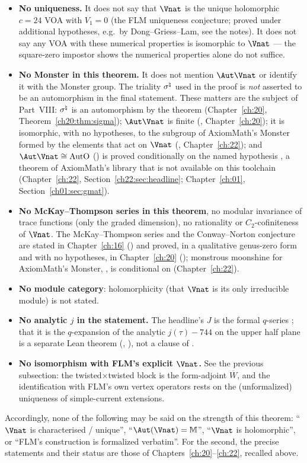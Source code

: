 \begin{itemize}
\item \textbf{No uniqueness.}  It does not say that $\Vnat$ is the unique holomorphic $c=24$ VOA with
  $V_1=0$ (the FLM uniqueness conjecture; proved under additional hypotheses, e.g.\ by
  Dong--Griess--Lam, see the notes).  It does not say any VOA with these numerical properties is
  isomorphic to $\Vnat$ — the square-zero impostor shows the numerical properties alone do not suffice.
\item \textbf{No Monster in this theorem.}  It does not mention $\Aut\Vnat$ or identify it with the Monster group.
  The triality $\sigma^{\natural}$ used in the proof is \emph{not} asserted to be an automorphism in the final
  statement.  These matters are the subject of Part~VIII: $\sigma^{\natural}$ is an automorphism by the theorem
   (Chapter~\ref{ch:20}, Theorem~\ref{ch20:thm:sigma}); $\Aut\Vnat$ is finite
  (, Chapter~\ref{ch:20}); it is isomorphic, with no hypotheses, to the subgroup of
  AxiomMath's Monster  formed by the elements that act on $\Vnat$
  (, Chapter~\ref{ch:22}); and $\Aut\Vnat\cong\mathrm{AutO}$
  () is proved conditionally on the named hypothesis , a theorem of
  AxiomMath's library that is not available on this toolchain (Chapter~\ref{ch:22}, Section~\ref{ch22:sec:headline};
  Chapter~\ref{ch:01}, Section~\ref{ch01:sec:gmat}).
\item \textbf{No McKay--Thompson series in this theorem}, no modular invariance of trace functions (only the graded
  dimension), no rationality or $C_2$-cofiniteness of $\Vnat$.  The McKay--Thompson series and the Conway--Norton
  conjecture are stated in Chapter~\ref{ch:16} () and proved, in a qualitative genus-zero
  form and with no hypotheses, in Chapter~\ref{ch:20} (); monstrous moonshine for AxiomMath's Monster,
  , is conditional on  (Chapter~\ref{ch:22}).
\item \textbf{No module category}: holomorphicity (that $\Vnat$ is its only irreducible module) is not
  stated.
\item \textbf{No analytic $j$ in the statement.}  The headline's $J$ is the formal $q$-series ; that it is
  the $q$-expansion of the analytic $j(\tau)-744$ on the upper half plane is a separate Lean theorem
  (, ), not a clause of .
\item \textbf{No isomorphism with FLM's explicit $\Vnat$.}  See the previous subsection: the
  twisted$\times$twisted block is the form-adjoint $\overline W$, and the identification with FLM's own
  vertex operators rests on the (unformalized) uniqueness of simple-current extensions.
\end{itemize}
Accordingly, none of the following may be said on the strength of this theorem: ``$\Vnat$ is characterised
/ unique'', ``$\Aut(\Vnat)=\mathbb M$'', ``$\Vnat$ is holomorphic'', or ``FLM's construction is formalized
verbatim''.  For the second, the precise statements and their status are those of Chapters~\ref{ch:20}--\ref{ch:22},
recalled above.

